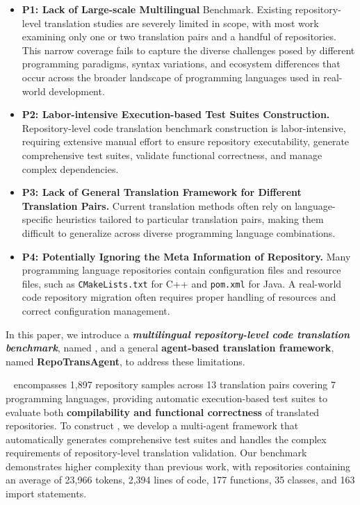 \begin{itemize}[left=2pt]%
    \item \textbf{P1: Lack of Large-scale Multilingual} Benchmark. Existing repository-level translation studies are severely limited in scope, with most work examining only one or two translation pairs and a handful of repositories. This narrow coverage fails to capture the diverse challenges posed by different programming paradigms, syntax variations, and ecosystem differences that occur across the broader landscape of programming languages used in real-world development.
    \item \textbf{P2: Labor-intensive Execution-based Test Suites Construction.} Repository-level code translation benchmark construction is labor-intensive, requiring extensive manual effort to ensure repository executability, generate comprehensive test suites, validate functional correctness, and manage complex dependencies.
    \item \textbf{P3: Lack of General Translation Framework for Different Translation Pairs.} Current translation methods often rely on language-specific heuristics tailored to particular translation pairs, making them difficult to generalize across diverse programming language combinations.
    \item \textbf{P4: Potentially Ignoring the Meta Information of Repository.} Many programming language repositories contain configuration files and resource files, such as \texttt{CMakeLists.txt} for C++ and \texttt{pom.xml} for Java. A real-world code repository migration often requires proper handling of resources and correct configuration management.
\end{itemize}

In this paper, we introduce a \textbf{\textit{multilingual repository-level code translation benchmark}}, named \textbf{\toolname}, and a general \textbf{agent-based translation framework}, named \textbf{RepoTransAgent}, to address these limitations.

\toolname~ encompasses 1,897 repository samples across 13 translation pairs covering 7 programming languages, providing automatic execution-based test suites to evaluate both \textbf{compilability and functional correctness} of translated repositories. To construct \toolname, we develop a multi-agent framework that automatically generates comprehensive test suites and handles the complex requirements of repository-level translation validation. Our benchmark demonstrates higher complexity than previous work, with repositories containing an average of 23,966 tokens, 2,394 lines of code, 177 functions, 35 classes, and 163 import statements.

